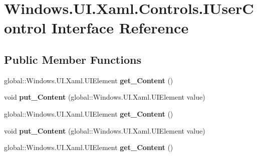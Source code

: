 \hypertarget{interface_windows_1_1_u_i_1_1_xaml_1_1_controls_1_1_i_user_control}{}\section{Windows.\+U\+I.\+Xaml.\+Controls.\+I\+User\+Control Interface Reference}
\label{interface_windows_1_1_u_i_1_1_xaml_1_1_controls_1_1_i_user_control}
\subsection*{Public Member Functions}
\begin{DoxyCompactItemize}
\item 
\mbox{\label{interface_windows_1_1_u_i_1_1_xaml_1_1_controls_1_1_i_user_control_a7908cb0005238b247539616e677346e6}} 
global\+::\+Windows.\+U\+I.\+Xaml.\+U\+I\+Element {\bfseries get\+\_\+\+Content} ()
\item 
\mbox{\label{interface_windows_1_1_u_i_1_1_xaml_1_1_controls_1_1_i_user_control_adefc31493ff26898833c8bc3a6336ecc}} 
void {\bfseries put\+\_\+\+Content} (global\+::\+Windows.\+U\+I.\+Xaml.\+U\+I\+Element value)
\item 
\mbox{\label{interface_windows_1_1_u_i_1_1_xaml_1_1_controls_1_1_i_user_control_a7908cb0005238b247539616e677346e6}} 
global\+::\+Windows.\+U\+I.\+Xaml.\+U\+I\+Element {\bfseries get\+\_\+\+Content} ()
\item 
\mbox{\label{interface_windows_1_1_u_i_1_1_xaml_1_1_controls_1_1_i_user_control_adefc31493ff26898833c8bc3a6336ecc}} 
void {\bfseries put\+\_\+\+Content} (global\+::\+Windows.\+U\+I.\+Xaml.\+U\+I\+Element value)
\item 
\mbox{\label{interface_windows_1_1_u_i_1_1_xaml_1_1_controls_1_1_i_user_control_a7908cb0005238b247539616e677346e6}} 
global\+::\+Windows.\+U\+I.\+Xaml.\+U\+I\+Element {\bfseries get\+\_\+\+Content} ()

\end{DoxyCompactItemize}
